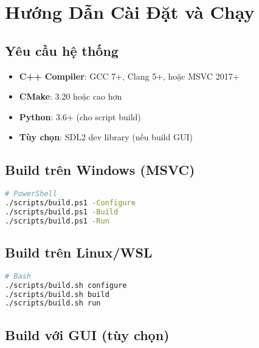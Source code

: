 \documentclass[12pt,a4paper]{report}
\begin{document}







\appendix

\chapter{Hướng Dẫn Cài Đặt và Chạy}
\label{app:installation}

\section{Yêu cầu hệ thống}

\begin{itemize}[leftmargin=1.5cm]
  \item \textbf{C++ Compiler}: GCC 7+, Clang 5+, hoặc MSVC 2017+
  \item \textbf{CMake}: 3.20 hoặc cao hơn
  \item \textbf{Python}: 3.6+ (cho script build)
  \item \textbf{Tùy chọn}: SDL2 dev library (nếu build GUI)
\end{itemize}

\section{Build trên Windows (MSVC)}

\begin{lstlisting}[language=bash]
# PowerShell
./scripts/build.ps1 -Configure
./scripts/build.ps1 -Build
./scripts/build.ps1 -Run
\end{lstlisting}

\section{Build trên Linux/WSL}

\begin{lstlisting}[language=bash]
# Bash
./scripts/build.sh configure
./scripts/build.sh build
./scripts/build.sh run
\end{lstlisting}

\section{Build với GUI (tùy chọn)}
\end{document}
